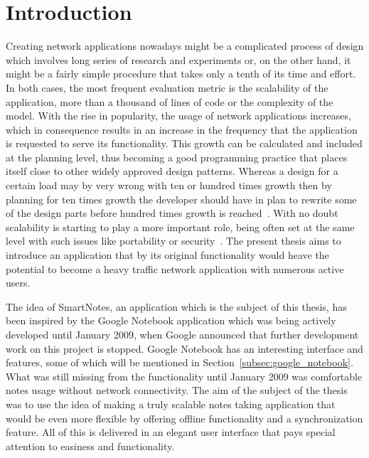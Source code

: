 \chapter{Introduction}\label{sec:Introduction}
Creating network applications nowadays might be a complicated process of design which involves long series of research and experiments or, on the other hand, it might be a fairly simple procedure that takes only a tenth of its time and effort. In both cases, the most frequent evaluation metric is the scalability of the application, more than a thousand of lines of code or the complexity of the model. With the rise in popularity, the usage of network applications increases, which in consequence results in an increase in the frequency that the application is requested to serve its functionality. This growth can be calculated and included at the planning level, thus becoming a good programming practice that places itself close to other widely approved design patterns. Whereas a design for a certain load may by very wrong with ten or hundred times growth then by planning for ten times growth the developer should have in plan to rewrite some of the design parts before hundred times growth is reached~\cite{google_wsdm}. With no doubt scalability is starting to play a more important role, being often set at the same level with such issues like portability or security~\cite{scalable_delft}. The present thesis aims to introduce an application that by its original functionality would heave the potential to become a heavy traffic network application with numerous active users. 

The idea of SmartNotes, an application which is the subject of this thesis, has been inspired by the Google Notebook application which was being actively developed until January 2009, when Google announced that further development work on this project is stopped. Google Notebook has an interesting interface and features, some of which will be mentioned in Section~\ref{subsec:google_notebook}. What was still missing from the functionality until January 2009 was comfortable notes usage without network connectivity. The aim of the subject of the thesis was to use the idea of making a truly scalable notes taking application that would be even more flexible by offering offline functionality and a synchronization feature. All of this is delivered in an elegant user interface that pays special attention to easiness and functionality.

